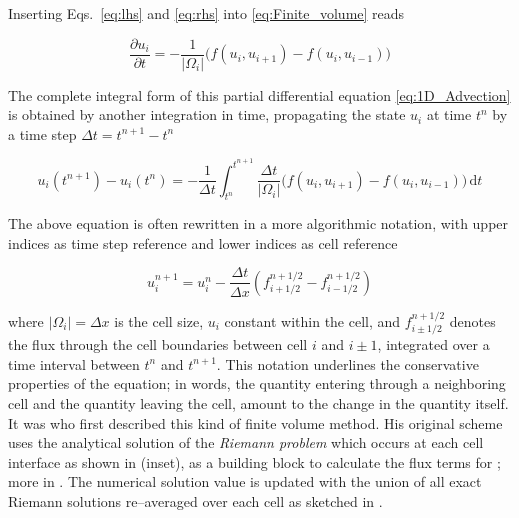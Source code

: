 Inserting Eqs.~\eqref{eq:lhs} and \eqref{eq:rhs} into \eqref{eq:Finite_volume} reads

\begin{equation}
  \frac{\partial u_{i}}{\partial t} =  - \frac{1}{\vert\Omega_{i}\vert} \big(f(u_{i}, u_{i+1}) - f(u_{i}, u_{i-1})\big)
\end{equation}

The complete integral form of this partial differential equation \eqref{eq:1D_Advection} is obtained by another integration in time, propagating the state $u_{i}$ at time $t^{n}$ by a time step $\Delta t = t^{n+1} - t^{n}$

\begin{equation}
  u_{i}(t^{n+1}) - u_{i}(t^{n}) = -\frac{1}{\Delta t} \int_{t^{n}}^{t^{n+1}} \frac{\Delta t}{\vert\Omega_{i}\vert} \big(f(u_{i}, u_{i+1}) - f(u_{i}, u_{i-1})\big)\,\mathrm{d}t
\end{equation}

The above equation is often rewritten in a more algorithmic notation, with upper indices as time step reference and lower indices as cell reference

\begin{equation}
  u_{i}^{n+1} = u_{i}^{n} - \frac{\Delta t}{\Delta x} (f^{n+1/2}_{i+1/2} - f^{n+1/2}_{i-1/2})
\label{eq:Godunov_step}
\end{equation}

where $\vert\Omega_{i}\vert = \Delta x$ is the cell size, $u_{i}$ constant within the cell, and $f^{n+1/2}_{i\pm1/2}$ denotes the flux through the cell boundaries between cell $i$ and $i\pm1$, integrated over a time interval between $t^{n}$ and $t^{n+1}$.
This notation underlines the conservative properties of the equation; in words, the quantity entering through a neighboring cell and the quantity leaving the cell, amount to the change in the quantity itself.
\\[6pt]
%
It was \citet{Godunov_1959} who first described this kind of finite volume method.
His original scheme uses the analytical solution of the \textit{Riemann problem} which occurs at each cell interface as shown in  (inset), as a building block to calculate the flux terms for ; more in .
The numerical solution value is updated with the union of all exact Riemann solutions re--averaged over each cell as sketched in .

